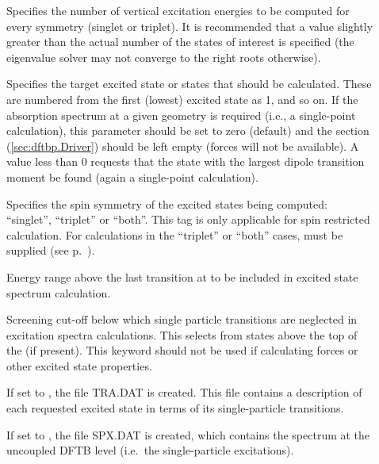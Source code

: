   \begin{description}

  \item[] Specifies the number of vertical excitation
    energies to be computed for every symmetry (singlet or triplet). It is
    recommended that a value slightly greater than the actual number of the
    states of interest is specified (the eigenvalue solver may not converge to
    the right roots otherwise).

  \item[] Specifies the target excited state or states that
    should be calculated. These are numbered from the first (lowest) excited
    state as 1, and so on. If the absorption spectrum at a given geometry is
    required (i.e., a single-point calculation), this parameter should be set to
    zero (default) and the  section (\ref{sec:dftbp.Driver}) should
    be left empty (forces will not be available). A value less than 0 requests
    that the state with the largest dipole transition moment be found (again a
    single-point calculation).

  \item[] Specifies the spin symmetry of the excited states being
    computed: ``singlet'', ``triplet'' or ``both''. This tag is only applicable
    for spin restricted calculation. For calculations in the ``triplet'' or
    ``both'' cases,  must be supplied (see
    p.~).

  \item[] Energy range above the last
    transition at  to be included in excited state spectrum
    calculation.

  \item[] Screening cut-off
    below which single particle transitions are neglected in excitation spectra
    calculations. This selects from states above the top of the
     (if present). This keyword should not be used if
    calculating forces or other excited state properties.

  \item[] If set to , the file TRA.DAT is
    created. This file contains a description of each requested excited state in
    terms of its single-particle transitions.

  \item[] If set to , the file SPX.DAT is
    created, which contains the spectrum at the uncoupled DFTB level (i.e.\ the
    single-particle excitations).


\end{description}
